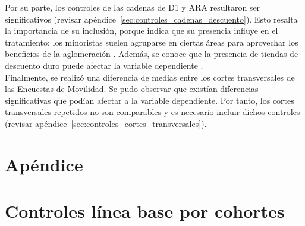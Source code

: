 \documentclass{article}
\begin{document}
Por su parte, los controles de las cadenas de D1 y ARA resultaron ser significativos (revisar apéndice~\ref{sec:controles_cadenas_descuento}). Esto resalta la importancia de su inclusión, porque indica que su presencia influye en el tratamiento; los minoristas suelen agruparse en ciertas áreas para aprovechar los beneficios de la aglomeración \parencite{Konishi2005, Seong2022}. Además, se conoce que la presencia de tiendas de descuento duro puede afectar la variable dependiente \parencite{delgado2024}. \\

Finalmente, se realizó una diferencia de medias entre los cortes transversales de las Encuestas de Movilidad. Se pudo observar que existían diferencias significativas que podían afectar a la variable dependiente. Por tanto, los cortes transversales repetidos no son comparables y es necesario incluir dichos controles (revisar apéndice~\ref{sec:controles_cortes_transversales}). \\

\newpage
\printbibliography

\newpage

\section{Apéndice}

\appendix
{}

\section{Controles línea base por cohortes}
\label{sec:controles_linea_base}
\end{document}
